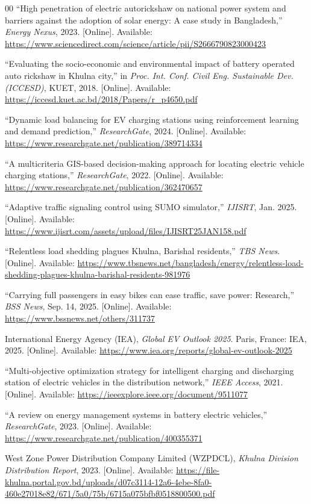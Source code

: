 \documentclass[conference]{IEEEtran}
\begin{document}
\begin{thebibliography}{00}
``High penetration of electric autorickshaw on national power system
and barriers against the adoption of solar energy: A case study in
Bangladesh,'' \textit{Energy Nexus}, 2023. [Online]. Available:
\url{https://www.sciencedirect.com/science/article/pii/S2666790823000423}

``Evaluating the socio-economic and environmental impact of battery
operated auto rickshaw in Khulna city,'' in \textit{Proc. Int. Conf.
Civil Eng. Sustainable Dev. (ICCESD)}, KUET, 2018. [Online]. Available:
\url{https://iccesd.kuet.ac.bd/2018/Papers/r_p4650.pdf}

``Dynamic load balancing for EV charging stations using reinforcement
learning and demand prediction,'' \textit{ResearchGate}, 2024.
[Online]. Available:
\url{https://www.researchgate.net/publication/389714334}

``A multicriteria GIS-based decision-making approach for locating
electric vehicle charging stations,'' \textit{ResearchGate}, 2022.
[Online]. Available:
\url{https://www.researchgate.net/publication/362470657}

``Adaptive traffic signaling control using SUMO simulator,''
\textit{IJISRT}, Jan. 2025. [Online]. Available:
\url{https://www.ijisrt.com/assets/upload/files/IJISRT25JAN158.pdf}

``Relentless load shedding plagues Khulna, Barishal residents,''
\textit{TBS News}. [Online]. Available:
\url{https://www.tbsnews.net/bangladesh/energy/relentless-load-shedding-plagues-khulna-barishal-residents-981976}

``Carrying full passengers in easy bikes can ease traffic, save power:
Research,'' \textit{BSS News}, Sep. 14, 2025. [Online]. Available:
\url{https://www.bssnews.net/others/311737}

International Energy Agency (IEA), \textit{Global EV Outlook 2025}.
Paris, France: IEA, 2025. [Online]. Available:
\url{https://www.iea.org/reports/global-ev-outlook-2025}

``Multi-objective optimization strategy for intelligent charging and
discharging station of electric vehicles in the distribution network,''
\textit{IEEE Access}, 2021. [Online]. Available:
\url{https://ieeexplore.ieee.org/document/9511077}

``A review on energy management systems in battery electric vehicles,''
\textit{ResearchGate}, 2023. [Online]. Available:
\url{https://www.researchgate.net/publication/400355371}

West Zone Power Distribution Company Limited (WZPDCL), \textit{Khulna
Division Distribution Report}, 2023. [Online]. Available:
\url{https://file-khulna.portal.gov.bd/uploads/d07c3114-12a6-4ebe-8fa0-460e27018e82/671/5a0/75b/6715a075bfbf0518800500.pdf}


\end{thebibliography}
\end{document}
